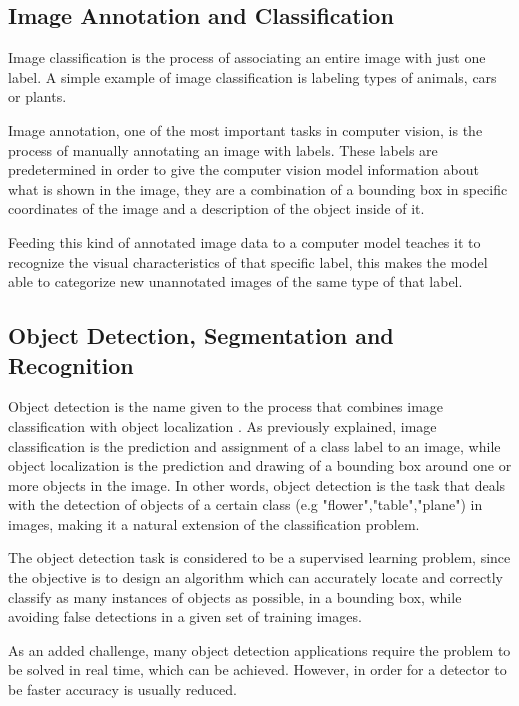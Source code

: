     
    \subsection{Image Annotation and Classification}
    Image classification is the process of associating an entire image with just one label. A simple example of image classification is labeling types of animals, cars or plants. \cite{Feng2019} \par
    Image annotation, one of the most important tasks in computer vision, is the process of manually annotating an image with labels. These labels are predetermined in order to give the computer vision model information about what is shown in the image, they are a combination of a bounding box in specific coordinates of the image  and a description of the object inside of it. \cite{annotation} \par

    Feeding this kind of annotated image data to a computer model teaches it to recognize the visual characteristics of that specific label, this makes the model able to categorize new unannotated images of the same type of that label.  


    \subsection{Object Detection, Segmentation and Recognition}
    \label{Object Detection}

    \par Object detection is the name given to the process that combines image classification with object localization \cite{ObjectDetection}. As previously explained, image classification is the prediction and assignment of a class label to an image, while object localization is the prediction and drawing of a bounding box around one or more objects in the image. In other words, object detection is the task that deals with the detection of objects of a certain class (e.g "flower","table","plane") in images, making it a natural extension of the classification problem. 

    \par The object detection task is considered to be a supervised learning problem, since the objective is to design an algorithm which can accurately locate and correctly classify as many instances of objects as possible, in a bounding box, while avoiding false detections in a given set of training images. 

    \par As an added challenge, many object detection applications require the problem to be solved in real time, which can be achieved. However, in order for a detector to be faster accuracy is usually reduced. 

